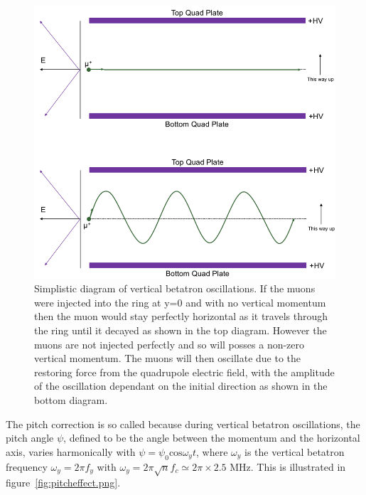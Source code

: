\begin{figure}[ht]
\centering 
\includegraphics[scale=0.5]{Figures/vertoscillationdiagram.png}
\decoRule
\caption{Simplistic diagram of vertical betatron oscillations. If the muons were injected into the ring at y=0 and with no vertical momentum then the muon would stay perfectly horizontal as it travels through the ring until it decayed as shown in the top diagram. However the muons are not injected perfectly and so will posses a non-zero vertical momentum. The muons will then oscillate due to the restoring force from the quadrupole electric field, with the amplitude of the oscillation dependant on the initial direction as shown in the bottom diagram.}
\label{fig:vertoscillationdiagram.png}
\end{figure}

The pitch correction is so called because during vertical betatron oscillations, the pitch angle $\psi$, defined to be the angle between the momentum and the horizontal axis, varies harmonically with $\psi = \psi_{0}\mathrm{cos}\omega_{y}t$, where $\omega_{y}$ is the vertical betatron frequency $\omega_{y} = 2\pi{f_{y}}$ with $\omega_{y} = 2\pi\sqrt{n}f_{c} \simeq2\pi\times2.5$ MHz. This is illustrated in figure~\ref{fig:pitcheffect.png}.

